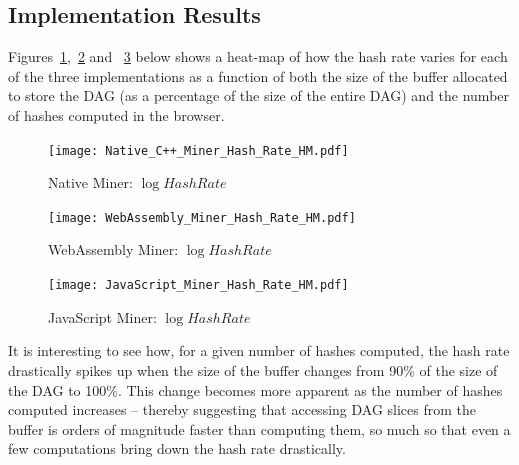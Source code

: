 \documentclass[runningheads]{llncs}
\newcommand{\trishita}[1]{{\color{magenta}\bfseries[Trishita: #1]}}
\begin{document}

\subsection{Implementation Results}
\label{sec:results}
Figures~\ref{fig:NativeMinerHM},~\ref{fig:WebAsmMinerHM} and ~\ref{fig:JSMinerHM} below shows a heat-map of how the hash rate varies for each of the three implementations as a function of both the size of the buffer allocated to store the DAG (as a percentage of the size of the entire DAG) and the number of hashes computed in the browser. 

\begin{figure}[h]
\centering
\texttt{[image: Native\_C++\_Miner\_Hash\_Rate\_HM.pdf]}
\caption{\label{fig:NativeMinerHM} Native Miner: $\log{Hash Rate}$}
\end{figure}

\begin{figure}[h]
\centering
\texttt{[image: WebAssembly\_Miner\_Hash\_Rate\_HM.pdf]}
\caption{\label{fig:WebAsmMinerHM} WebAssembly Miner: $\log{Hash Rate}$}
\end{figure}

\begin{figure}[h]
\centering
\texttt{[image: JavaScript\_Miner\_Hash\_Rate\_HM.pdf]}
\caption{\label{fig:JSMinerHM} JavaScript Miner: $\log{Hash Rate}$}
\end{figure}


It is interesting to see how, for a given number of hashes computed, the hash rate drastically spikes up when the size of the buffer changes from 90\% of the size of the DAG to 100\%. This change becomes more apparent as the number of hashes computed increases -- thereby suggesting that accessing DAG slices from the buffer is orders of magnitude faster than computing them, so much so that even a few computations bring down the hash rate drastically. 
\end{document}
